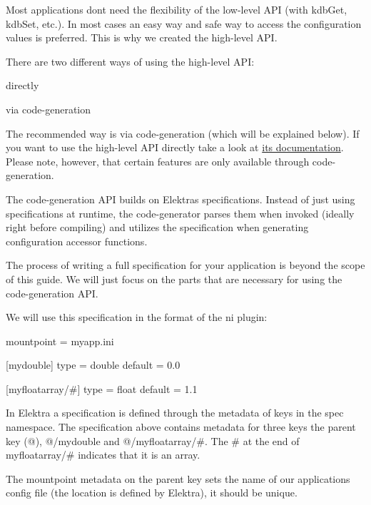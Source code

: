 Most applications don\textquotesingle{}t need the flexibility of the low-\/level A\+PI (with {\ttfamily kdb\+Get}, {\ttfamily kdb\+Set}, etc.). In most cases an easy way and safe way to access the configuration values is preferred. This is why we created the high-\/level A\+PI.

There are two different ways of using the high-\/level A\+PI\+:


\begin{DoxyEnumerate}
\item directly
\item via code-\/generation
\end{DoxyEnumerate}

The recommended way is via code-\/generation (which will be explained below). If you want to use the high-\/level A\+PI directly take a look at \hyperlink{src_libs_highlevel_README_md}{its documentation}. Please note, however, that certain features are only available through code-\/generation.

The code-\/generation A\+PI builds on Elektra\textquotesingle{}s specifications. Instead of just using specifications at runtime, the code-\/generator parses them when invoked (ideally right before compiling) and utilizes the specification when generating configuration accessor functions.

The process of writing a full specification for your application is beyond the scope of this guide. We will just focus on the parts that are necessary for using the code-\/generation A\+PI.

We will use this specification in the format of the {\ttfamily ni} plugin\+:


\begin{DoxyCode}
[]
mountpoint = myapp.ini

[mydouble]
type = double
default = 0.0

[myfloatarray/#]
type = float
default = 1.1
\end{DoxyCode}


In Elektra a specification is defined through the metadata of keys in the {\ttfamily spec} namespace. The specification above contains metadata for three keys the parent key ({\ttfamily @}), {\ttfamily @/mydouble} and {\ttfamily @/myfloatarray/\#}. The {\ttfamily \#} at the end of {\ttfamily myfloatarray/\#} indicates that it is an array.

The {\ttfamily mountpoint} metadata on the parent key sets the name of our application\textquotesingle{}s config file (the location is defined by Elektra), it should be unique.


